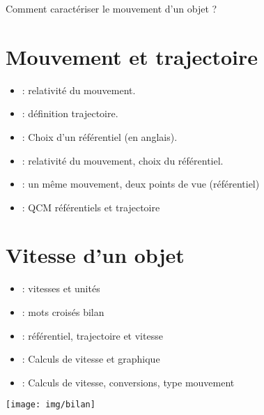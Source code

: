 \documentclass[12pt,a4paper]{article}
\date{}
\title{}
\begin{document}
	
\graphicspath{{./img/}}	



\begin{mypb}
	\begin{center}
		{\Large Comment caractériser le mouvement d'un objet ?}
	\end{center}
\end{mypb}


\section{Mouvement et trajectoire}

%






\begin{myexos}
	\begin{itemize}
		
		\item {}  : relativité du mouvement.
		\item {}  : définition trajectoire.
		\item {}  : Choix d'un référentiel (en anglais).
		\item {} : relativité du mouvement, choix du référentiel.
		\item {} : un même mouvement, deux points de vue (référentiel)
		\item {} : QCM référentiels et trajectoire
	\end{itemize}
\end{myexos}

\section{Vitesse d'un objet}

%






\begin{myexos}
	\begin{itemize}
		\item {}  : vitesses et unités
		\item {}  : mots croisés bilan
		\item {} : référentiel, trajectoire et vitesse
		\item {}  : Calculs de vitesse et graphique		
		\item {}  : Calculs de vitesse, conversions, type mouvement	
	\end{itemize}
\end{myexos}

\begin{center}
	\texttt{[image: img/bilan]}
\end{center}

\appendix

\end{document}
